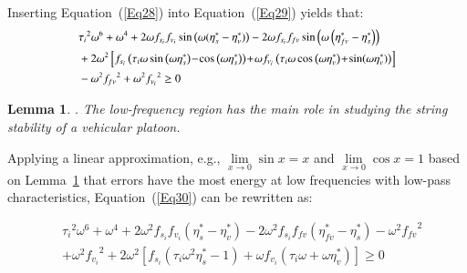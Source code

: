 \documentclass[journal]{IEEEtran}
\newtheorem{lemma}[theorem]{Lemma}
\begin{document}
Inserting Equation~(\ref{Eq28}) into Equation~(\ref{Eq29}) yields that:
\begin{equation}
  \begin{small}
    \begin{aligned}
       & {\tau_i}^2\omega^6+\omega^4+2\omega f_{s_i}f_{v_i}\sin{\left(\omega(\eta_s^\ast-\eta_v^\ast)\right)}-2\omega f_{s_i}f_{fv}\sin{\left(\omega\left(\eta_{fv}^\ast-\eta_s^\ast\right)\right)}                                                           \\
       & +2\omega^2\left[f_{s_i}\left(\tau_i\omega \sin\left(\omega\eta_s^\ast\right)\! -\! \cos \left(\omega\eta_s^\ast\right)\right)\! +\! \omega f_{v_i}\left(\tau_i\omega \cos \left(\omega\eta_v^\ast\right)\! +\! \sin(\omega\eta_v^\ast)\right)\right] \\
       & -\omega^2{f_{fv}}^2 +\omega^2{f_{v_i}}^2    \geq0
    \end{aligned}
  \end{small}
  \label{Eq30}
\end{equation}

\begin{lemma}
  \label{lemma1}
  \citep{seiler2004disturbance,chehardoli2021robust,chehardoli2020robust,chehardoli2018adaptive}. The low-frequency region has the main role in studying the string stability of a vehicular platoon.
\end{lemma}

Applying a linear approximation, e.g., $\mathop {lim}\limits_{x \to 0} \sin x = x$ and $\mathop {lim}\limits_{x \to 0} \cos x = 1$ based on Lemma~\ref{lemma1} that errors have the most energy at low frequencies with low-pass characteristics, Equation~(\ref{Eq30}) can be rewritten as:

\begin{equation}
  \begin{aligned}
     & {\tau_i}^2\omega^6+\omega^4+2\omega^2f_{s_i}f_{v_i}\left(\eta_s^\ast-\eta_v^\ast\right)-2\omega^2f_{s_i}f_{fv}\left(\eta_{fv}^\ast-\eta_s^\ast\right)-\omega^2{f_{fv}}^2 \\
     & +\omega^2{f_{v_i}}^2+2\omega^2\left[f_{s_i}\left(\tau_i\omega^2\eta_s^\ast-1\right)+\omega f_{v_i}\left(\tau_i\omega+\omega\eta_v^\ast\right)\right]\geq0
  \end{aligned}
  \label{Eq31}
\end{equation}
\end{document}
